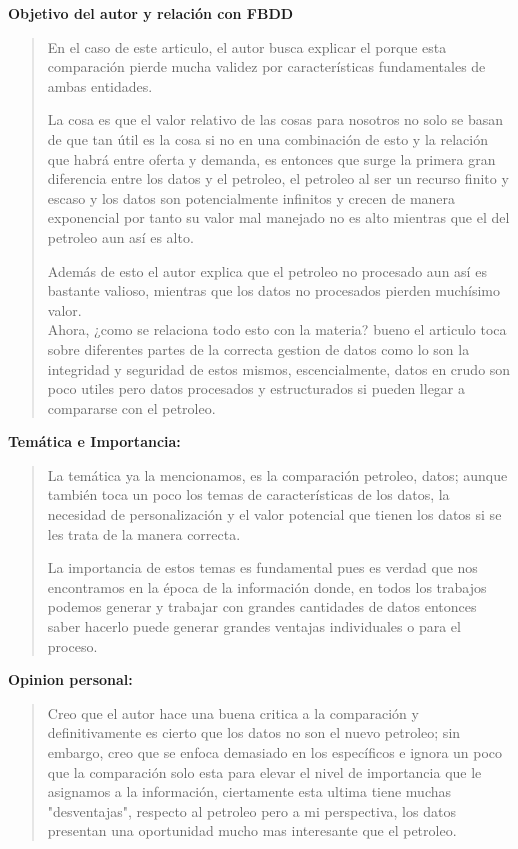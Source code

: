 \textbf{Objetivo del autor y relación con FBDD}
\begin{quote}
    En el caso de este articulo, el autor busca explicar el porque esta comparación pierde mucha validez por características fundamentales de ambas entidades.
    \vspace{.2cm}   
    
    La cosa es que el valor relativo de las cosas para nosotros no solo se basan de que tan útil es la cosa si no en una combinación de esto y la relación que habrá entre oferta y demanda, es entonces que surge la primera gran diferencia entre los datos y el petroleo, el petroleo al ser un recurso finito y escaso y los datos son potencialmente infinitos y crecen de manera exponencial por tanto su valor mal manejado no es alto mientras que el del petroleo aun así es alto.
    \vspace{.2cm}   

    Además de esto el autor explica que el petroleo no procesado aun así es bastante valioso, mientras que los datos no procesados pierden muchísimo valor.\\
    Ahora, ¿como se relaciona todo esto con la materia? bueno el articulo toca sobre diferentes partes de la correcta gestion de datos como lo son la integridad y seguridad de estos mismos, escencialmente, datos en crudo son poco utiles pero datos procesados y estructurados si pueden llegar a compararse con el petroleo.
\end{quote}

\textbf{Temática e Importancia:}
\begin{quote}
    La temática ya la mencionamos, es la comparación petroleo, datos; aunque también toca un poco los temas de características de los datos, la necesidad de personalización y el valor potencial que tienen los datos si se les trata de la manera correcta. 
    \vspace{.2cm}   
    
    La importancia de estos temas es fundamental pues es verdad que nos encontramos en la época de la información donde, en todos los trabajos podemos generar y trabajar con grandes cantidades de datos entonces saber hacerlo puede generar grandes ventajas individuales o para el proceso.
\end{quote}

\textbf{Opinion personal:}
\begin{quote}
    Creo que el autor hace una buena critica a la comparación y definitivamente es cierto que los datos no son el nuevo petroleo; sin embargo, creo que se enfoca demasiado en los específicos e ignora un poco que la comparación solo esta para elevar el nivel de importancia que le asignamos a la información, ciertamente esta ultima tiene muchas "desventajas", respecto al petroleo pero a mi perspectiva, los datos presentan una oportunidad mucho mas interesante que el petroleo.
\end{quote}

